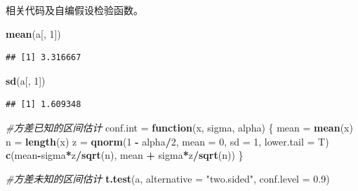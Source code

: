 \documentclass[]{ctexbook}
\newenvironment{Shaded}{\begin{snugshade}}{\end{snugshade}}
\newcommand{\CommentTok}[1]{\textcolor[rgb]{0.56,0.35,0.01}{\textit{#1}}}
\newcommand{\ControlFlowTok}[1]{\textcolor[rgb]{0.13,0.29,0.53}{\textbf{#1}}}
\newcommand{\DataTypeTok}[1]{\textcolor[rgb]{0.13,0.29,0.53}{#1}}
\newcommand{\DecValTok}[1]{\textcolor[rgb]{0.00,0.00,0.81}{#1}}
\newcommand{\FloatTok}[1]{\textcolor[rgb]{0.00,0.00,0.81}{#1}}
\newcommand{\KeywordTok}[1]{\textcolor[rgb]{0.13,0.29,0.53}{\textbf{#1}}}
\newcommand{\NormalTok}[1]{#1}
\newcommand{\OperatorTok}[1]{\textcolor[rgb]{0.81,0.36,0.00}{\textbf{#1}}}
\newcommand{\StringTok}[1]{\textcolor[rgb]{0.31,0.60,0.02}{#1}}
\begin{document}
相关代码及自编假设检验函数。

\begin{Shaded}
\begin{Highlighting}[]
\KeywordTok{mean}\NormalTok{(a[, }\DecValTok{1}\NormalTok{])}
\end{Highlighting}
\end{Shaded}

\begin{verbatim}
## [1] 3.316667
\end{verbatim}

\begin{Shaded}
\begin{Highlighting}[]
\KeywordTok{sd}\NormalTok{(a[, }\DecValTok{1}\NormalTok{])}
\end{Highlighting}
\end{Shaded}

\begin{verbatim}
## [1] 1.609348
\end{verbatim}

\begin{Shaded}
\begin{Highlighting}[]
\CommentTok{#方差已知的区间估计}
\NormalTok{conf.int =}\StringTok{ }\ControlFlowTok{function}\NormalTok{(x, sigma, alpha) \{}
\NormalTok{  mean =}\StringTok{ }\KeywordTok{mean}\NormalTok{(x)}
\NormalTok{  n =}\StringTok{ }\KeywordTok{length}\NormalTok{(x)}
\NormalTok{  z =}\StringTok{ }\KeywordTok{qnorm}\NormalTok{(}\DecValTok{1} \OperatorTok{-}\StringTok{ }\NormalTok{alpha}\OperatorTok{/}\DecValTok{2}\NormalTok{, }\DataTypeTok{mean =} \DecValTok{0}\NormalTok{, }\DataTypeTok{sd =} \DecValTok{1}\NormalTok{, }\DataTypeTok{lower.tail =}\NormalTok{ T)}
  \KeywordTok{c}\NormalTok{(mean}\OperatorTok{-}\NormalTok{sigma}\OperatorTok{*}\NormalTok{z}\OperatorTok{/}\KeywordTok{sqrt}\NormalTok{(n), mean }\OperatorTok{+}\StringTok{ }\NormalTok{sigma}\OperatorTok{*}\NormalTok{z}\OperatorTok{/}\KeywordTok{sqrt}\NormalTok{(n))}
\NormalTok{\}}
\end{Highlighting}
\end{Shaded}

\begin{Shaded}
\begin{Highlighting}[]
\CommentTok{#方差未知的区间估计}
\KeywordTok{t.test}\NormalTok{(a, }\DataTypeTok{alternative =} \StringTok{"two.sided"}\NormalTok{, }\DataTypeTok{conf.level =} \FloatTok{0.9}\NormalTok{)}
\end{Highlighting}
\end{Shaded}
\end{document}
